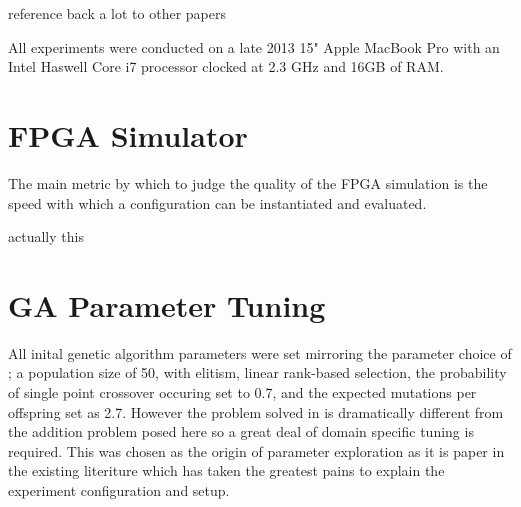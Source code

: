 \todo reference back a lot to other papers

All experiments were conducted on a late 2013 15" Apple MacBook Pro with an
Intel Haswell Core i7 processor clocked at 2.3 GHz and 16GB of RAM.

\section{FPGA Simulator}
The main metric by which to judge the quality of the FPGA simulation is the
speed with which a configuration can be instantiated and evaluated.

\todo actually this

\section{GA Parameter Tuning}
All inital genetic algorithm parameters were set mirroring the parameter choice
of \cite{10.1007/3-540-63173-9_61};
a population size of 50, with elitism, linear rank-based selection, the probability
of single point crossover occuring set to 0.7, and the expected mutations per
offspring set as 2.7. However the problem solved in \cite{10.1007/3-540-63173-9_61}
is dramatically different from the addition problem posed here so a great deal
of domain specific tuning is required. This was chosen as the origin of parameter
exploration as it is paper in the existing literiture which has taken the greatest
pains to explain the experiment configuration and setup.

